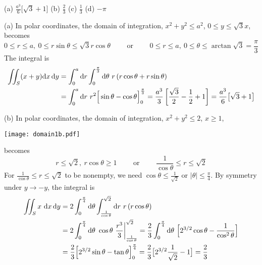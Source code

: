 \begin{answer}
(a) $\frac{a^3}{6}\big[\sqrt{3}+1\big]$\qquad
(b) $\frac{2}{3}$  \qquad
(c) $\frac{1}{3}$ \qquad
(d) $-\pi$
\end{answer}

\begin{solution}
(a) In polar coordinates, the domain of integration,
$x^2+y^2\le a^2$, $0\le y\le \sqrt{3}x$, becomes 
\begin{equation*}
0\le r\le a,\ 0\le r\sin\theta\le\sqrt{3}r\cos\theta\qquad\text{ or }\qquad
0\le r\le a,\ 0\le\theta\le \arctan\sqrt{3}=\frac{\pi}{3}
\end{equation*}
The integral is 
\begin{align*}
\dblInt_S (x+y)\dee{x}\,\dee{y}
&=\int_0^a \dee{r}\int_0^{{\pi\over 3}}\dee{\theta}\ r\,(r\cos\theta+r\sin\theta)\\
&=\int_0^a \dee{r}\ r^2\Big[\sin\theta-\cos\theta\Big]_0^{{\pi\over 3}}
=\frac{a^3}{3}\left[\frac{\sqrt{3}}{2}-\frac{1}{2}+1\right]
=\frac{a^3}{6}\big[\sqrt{3}+1\big]
\end{align*}

(b) 
In polar coordinates, the domain of integration,
$x^2+y^2\le 2$, $x\ge 1$, 

\begin{center}
     \texttt{[image: domain1b.pdf]}
\end{center}

becomes 
\begin{equation*}
r\le \sqrt{2},\ r\cos\theta\ge 1\qquad\text{ or }\qquad
  \frac{1}{\cos\theta}\le r\le\sqrt{2}
\end{equation*}
For $\frac{1}{\cos\theta}\le r\le\sqrt{2}$ to be nonempty, we need
$\cos\theta\le \frac{1}{\sqrt{2}}$ or $|\theta|\le\frac{\pi}{4}$.
By symmetry under $y\rightarrow -y$, the integral is 
\begin{align*}
\dblInt_Sx\ \dee{x}\,\dee{y}
&=2\int_0^{{\pi\over 4}}\dee{\theta}\int_{1\over\cos\theta}^{\sqrt{2}} 
\dee{r}\ r\,(r\cos\theta)\\
&=2\int_0^{{\pi\over 4}}\dee{\theta}\ \cos\theta\ 
\frac{r^3}{3}\bigg|_{1\over\cos\theta}^{\sqrt{2}} 
=\frac{2}{3}\int_0^{{\pi\over 4}}\dee{\theta}\ 
\Big[2^{3/2}\cos\theta-\frac{1}{\cos^2\theta}\Big] \\
&=\frac{2}{3} \Big[2^{3/2}\sin\theta-\tan\theta\Big]_0^{{\pi\over 4}}
=\frac{2}{3} \big[2^{3/2}\frac{1}{\sqrt{2}}-1\big]
=\frac{2}{3}
\end{align*}


\end{solution}
